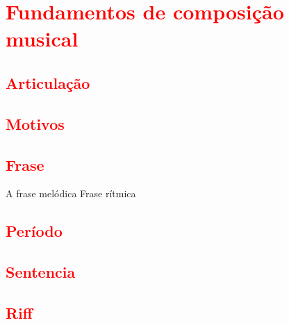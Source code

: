 
\chapter{\textcolor{red}{Fundamentos de composição musical}}

\section{\textcolor{red}{Articulação}}


\section{\textcolor{red}{Motivos}}

\section{\textcolor{red}{Frase}}
A frase melódica
Frase rítmica
\section{\textcolor{red}{Período}}
\section{\textcolor{red}{Sentencia}}
\section{\textcolor{red}{Riff}}

